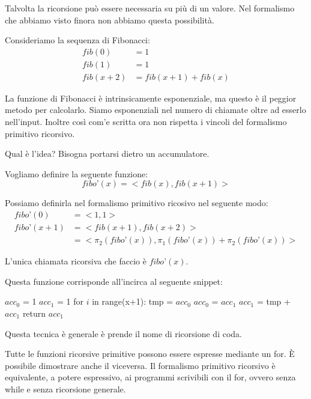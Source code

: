 Talvolta la ricorsione può essere necessaria su più di un valore. Nel formalismo che abbiamo visto
finora non abbiamo questa possibilità.

Consideriamo la sequenza di Fibonacci:
\begin{align*}
    \textit{fib}(0) &= 1 \\
    \textit{fib}(1) &= 1 \\
    \textit{fib}(x+2) &= \textit{fib}(x+1) + \textit{fib}(x)
\end{align*}

La funzione di Fibonacci è intrinsicamente esponenziale, ma questo è il peggior metodo per
calcolarlo. Siamo esponenziali nel numero di chiamate oltre ad esserlo nell'input. Inoltre così
com'e scritta ora non rispetta i vincoli del formalismo primitivo ricorsivo.

Qual è l'idea? Bisogna portarsi dietro un accumulatore.

Vogliamo definire la seguente funzione:
\begin{equation*}
    \textit{fibo'}(x) = <\textit{fib}(x),\textit{fib}(x+1)>
\end{equation*}

Possiamo definirla nel formalismo primitivo ricosivo nel seguente modo:
\begin{align*}
    \textit{fibo'}(0) &= <1,1> \\
    \textit{fibo'}(x+1) &= <\textit{fib}(x+1),\textit{fib}(x+2)> \\
    &= <\pi_{2}(\textit{fibo'}(x)),\pi_{1}(\textit{fibo'}(x)) + \pi_{2}(\textit{fibo'}(x))>
\end{align*}

L'unica chiamata ricorsiva che faccio è $\textit{fibo'}(x)$.

Questa funzione corrisponde all'incirca al seguente snippet:
 
\begin{python}
$acc_{0}$ = 1
$acc_{1}$ = 1 
for $i$ in range(x+1):
    tmp = $acc_{0}$
    $acc_{0}$ = $acc_{1}$
    $acc_{1}$ = tmp + $acc_{1}$
return $acc_{1}$
\end{python}

Questa tecnica è generale è prende il nome di ricorsione di coda.

Tutte le funzioni ricorsive primitive possono essere espresse mediante un for. È possibile
dimostrare anche il viceversa. Il formalismo primitivo ricorsivo è equivalente, a potere
espressivo, ai programmi scrivibili con il for, ovvero senza while e senza ricorsione generale.

